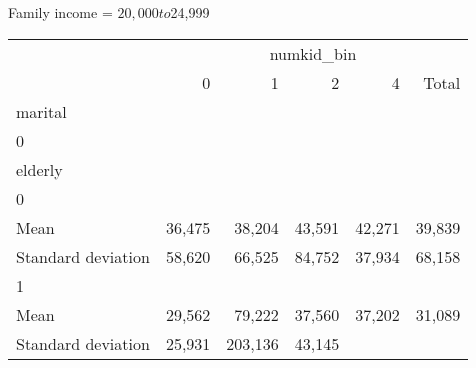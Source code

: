 Family income = $20,000 to $24,999
\begin{tabular}{llllll}
\cline{1-6}
\multicolumn{1}{c}{} &
  \multicolumn{5}{|c}{numkid\_bin} \\
\multicolumn{1}{c}{} &
  \multicolumn{1}{|r}{0} &
  \multicolumn{1}{r}{1} &
  \multicolumn{1}{r}{2} &
  \multicolumn{1}{r}{4} &
  \multicolumn{1}{r}{Total} \\
\cline{1-6}
\multicolumn{1}{l}{marital} &
  \multicolumn{1}{|r}{} &
  \multicolumn{1}{r}{} &
  \multicolumn{1}{r}{} &
  \multicolumn{1}{r}{} &
  \multicolumn{1}{r}{} \\
\multicolumn{1}{l}{\hspace{1em}0} &
  \multicolumn{1}{|r}{} &
  \multicolumn{1}{r}{} &
  \multicolumn{1}{r}{} &
  \multicolumn{1}{r}{} &
  \multicolumn{1}{r}{} \\
\multicolumn{1}{l}{\hspace{2em}elderly} &
  \multicolumn{1}{|r}{} &
  \multicolumn{1}{r}{} &
  \multicolumn{1}{r}{} &
  \multicolumn{1}{r}{} &
  \multicolumn{1}{r}{} \\
\multicolumn{1}{l}{\hspace{3em}0} &
  \multicolumn{1}{|r}{} &
  \multicolumn{1}{r}{} &
  \multicolumn{1}{r}{} &
  \multicolumn{1}{r}{} &
  \multicolumn{1}{r}{} \\
\multicolumn{1}{l}{\hspace{4em}Mean} &
  \multicolumn{1}{|r}{36,475} &
  \multicolumn{1}{r}{38,204} &
  \multicolumn{1}{r}{43,591} &
  \multicolumn{1}{r}{42,271} &
  \multicolumn{1}{r}{39,839} \\
\multicolumn{1}{l}{\hspace{4em}Standard deviation} &
  \multicolumn{1}{|r}{58,620} &
  \multicolumn{1}{r}{66,525} &
  \multicolumn{1}{r}{84,752} &
  \multicolumn{1}{r}{37,934} &
  \multicolumn{1}{r}{68,158} \\
\multicolumn{1}{l}{\hspace{3em}1} &
  \multicolumn{1}{|r}{} &
  \multicolumn{1}{r}{} &
  \multicolumn{1}{r}{} &
  \multicolumn{1}{r}{} &
  \multicolumn{1}{r}{} \\
\multicolumn{1}{l}{\hspace{4em}Mean} &
  \multicolumn{1}{|r}{29,562} &
  \multicolumn{1}{r}{79,222} &
  \multicolumn{1}{r}{37,560} &
  \multicolumn{1}{r}{37,202} &
  \multicolumn{1}{r}{31,089} \\
\multicolumn{1}{l}{\hspace{4em}Standard deviation} &
  \multicolumn{1}{|r}{25,931} &
  \multicolumn{1}{r}{203,136} &
  \multicolumn{1}{r}{43,145} &

\end{tabular}
